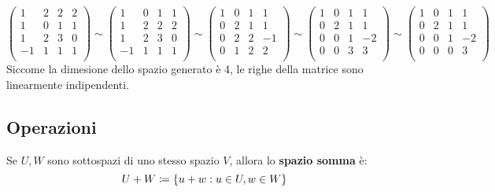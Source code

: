 \begin{example}
  $$
    \begin{pmatrix}
      1  & 2 & 2 & 2 \\
      1  & 0 & 1 & 1 \\
      1  & 2 & 3 & 0 \\
      -1 & 1 & 1 & 1 \\
    \end{pmatrix}
    \sim
    \begin{pmatrix}
      1  & 0 & 1 & 1 \\
      1  & 2 & 2 & 2 \\
      1  & 2 & 3 & 0 \\
      -1 & 1 & 1 & 1 \\
    \end{pmatrix}
    \sim
    \begin{pmatrix}
      1 & 0 & 1 & 1  \\
      0 & 2 & 1 & 1  \\
      0 & 2 & 2 & -1 \\
      0 & 1 & 2 & 2  \\
    \end{pmatrix}
    \sim
    \begin{pmatrix}
      1 & 0 & 1 & 1  \\
      0 & 2 & 1 & 1  \\
      0 & 0 & 1 & -2 \\
      0 & 0 & 3 & 3  \\
    \end{pmatrix}
    \sim
    \begin{pmatrix}
      1 & 0 & 1 & 1  \\
      0 & 2 & 1 & 1  \\
      0 & 0 & 1 & -2 \\
      0 & 0 & 0 & 3  \\
    \end{pmatrix}
  $$
  Siccome la dimesione dello spazio generato è 4, le righe della matrice sono linearmente indipendenti.
\end{example}

\subsection{Operazioni}

\begin{definition}
  Se $U,W$ sono sottospazi di uno stesso spazio $V$, allora lo \textbf{spazio somma} è:
  $$U+W\coloneqq \left\{ u+w:u\in U,w\in W \right\}$$
\end{definition}

